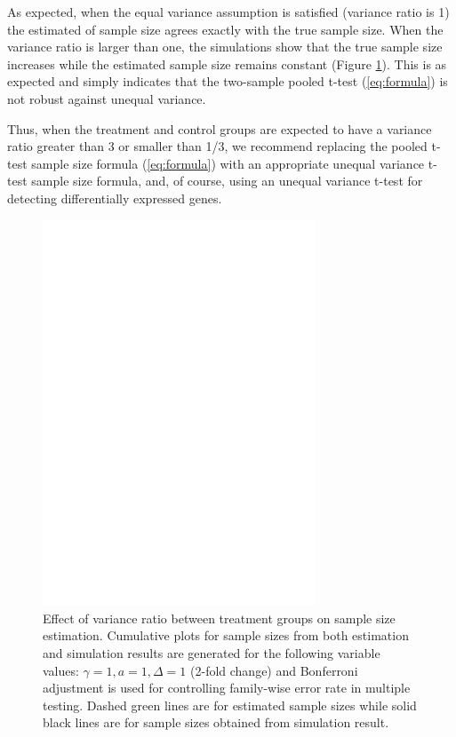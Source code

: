 \documentclass{bioinfo}
\begin{document}
As expected, when the equal variance assumption is satisfied
(variance ratio is 1) the estimated of sample size agrees exactly
with the true sample size. When the variance ratio is larger than
one, the simulations show that the true sample size increases
while the estimated sample size remains constant (Figure
\ref{fig:ResVar}).   This is as expected and simply indicates that
the two-sample pooled t-test (\ref{eq:formula}) is not robust
against unequal variance.

Thus, when the treatment and control groups are expected to have a
variance ratio greater than 3 or smaller than 1/3, we recommend
replacing the pooled t-test sample size formula (\ref{eq:formula})
with an appropriate unequal variance t-test sample size formula,
and, of course, using an unequal variance t-test for detecting
differentially expressed genes.

\begin{figure}[h]
  \centerline{\includegraphics*[width=3.2in]{ResVarF.pdf}}
  \caption[Effect of variance ratio between treatment groups on sample size estimation]
  {Effect of variance ratio between treatment groups on sample size estimation.
    Cumulative plots for sample sizes from both estimation and simulation
    results are generated for the following variable values: $\gamma = 1, a = 1, \Delta = 1$ (2-fold
    change) and Bonferroni adjustment is used for controlling family-wise error rate in multiple testing. Dashed green lines are for estimated sample sizes
    while solid black lines are for sample sizes obtained from simulation result.}
  \label{fig:ResVar}
\end{figure}
\end{document}

